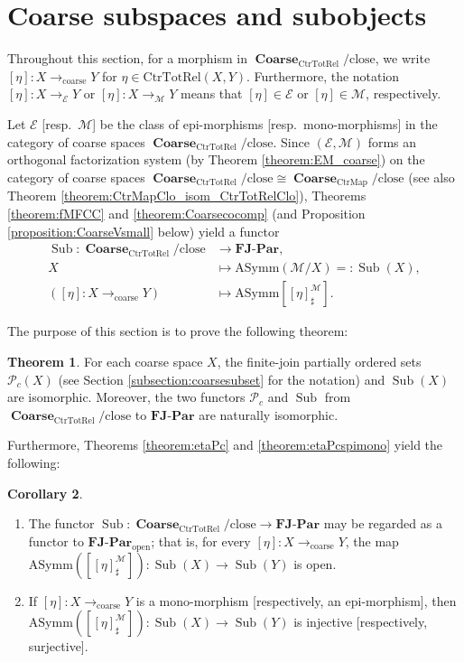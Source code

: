 \documentclass[12pt, a4paper]{amsart}
\theoremstyle{definition}
\newtheorem{theorem}{Theorem}[section]
\newtheorem{corollary}[theorem]{Corollary}
\newcommand{\open}{\mathop{\mathrm{open}}\nolimits}
\newcommand{\Coarse}{\mathop{\mathbf{Coarse}}\nolimits}
\newcommand{\CtrMap}{\mathrm{CtrMap}}
\newcommand{\CtrTotRel}{\mathrm{CtrTotRel}}
\newcommand{\close}{\mathrm{close}}
\newcommand{\AS}{\mathrm{ASymm}}
\newcommand{\FinJoinParOrd}{\mathbf{FJ}\text{-}\mathbf{Par}}
\newcommand{\Sub}{\operatorname{Sub}}
\begin{document}
\section{Coarse subspaces and subobjects}\label{section:subspace_subobject}

Throughout this section, 
for a morphism in
$\Coarse_{\CtrTotRel}/\close$,
we write
$[\eta] :
X \rightarrow_{\mathrm{coarse}} Y$
for
$\eta\in\CtrTotRel(X,Y)$.
Furthermore, the notation 
$[\eta] :
X \rightarrow_{\mathcal{E}} Y$ 
or
$[\eta] :
X \rightarrow_{\mathcal{M}} Y$
means that
$[\eta]\in\mathcal{E}$
or
$[\eta]\in\mathcal{M}$,
respectively.

Let $\mathcal{E}$ [resp.~$\mathcal{M}$] be the class of epi-morphisms
[resp.~mono-morphisms]  in the category of coarse spaces
$\Coarse_{\CtrTotRel}/\close$.
Since $(\mathcal{E},\mathcal{M})$ forms an orthogonal factorization system (by Theorem \ref{theorem:EM_coarse}) on the category of coarse spaces $\Coarse_{\CtrTotRel}/{\close} \cong \Coarse_{\CtrMap}/{\close}$ (see also Theorem \ref{theorem:CtrMapClo_isom_CtrTotRelClo}), Theorems \ref{theorem:fMFCC} and  \ref{theorem:Coarsecocomp} (and Proposition \ref{proposition:CoarseVsmall} below) yield a functor
\begin{align*}
\Sub :
\Coarse_{\CtrTotRel}/{\close}
    &\longrightarrow
\FinJoinParOrd, \\
X
    &\longmapsto
\AS(\mathcal{M}/X) =:\Sub(X), \\
([\eta] : X \rightarrow_{\mathrm{coarse}} Y)
    &\longmapsto 
\AS[[\eta]^{\mathcal{M}}_{\sharp}].
\end{align*}

The purpose of this section is to prove the following theorem:

\begin{theorem}\label{theorem:PcSub}
For each coarse space $X$, the finite-join partially ordered sets $\mathcal{P}_c(X)$ (see Section \ref{subsection:coarsesubset} for the notation) and $\Sub(X)$ are isomorphic. Moreover, the two functors $\mathcal{P}_c$ and $\Sub$ from $\Coarse_{\CtrTotRel}/{\close}$ to $\FinJoinParOrd$ are naturally isomorphic.
\end{theorem}

Furthermore, Theorems \ref{theorem:etaPc} and \ref{theorem:etaPcspimono} yield the following:

\begin{corollary}
\begin{enumerate}
    \item The functor $\Sub : \Coarse_{\CtrTotRel}/{\close} \rightarrow \FinJoinParOrd$ may be regarded as a functor to $\FinJoinParOrd_{\open}$; that is, for every $[\eta] : X \rightarrow_{\mathrm{coarse}} Y$, the map $\AS([[\eta]^\mathcal{M}_\sharp]) : \Sub(X) \rightarrow \Sub(Y)$ is open.
    \item If $[\eta] : X \rightarrow_{\mathrm{coarse}} Y$ is a mono-morphism [respectively, an epi-morphism], then $\AS([[\eta]^\mathcal{M}_\sharp]) : \Sub(X) \rightarrow \Sub(Y)$ is injective [respectively, surjective].
\end{enumerate}
\end{corollary}
\end{document}
